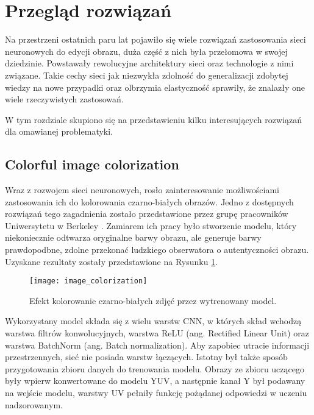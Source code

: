 \section{Przegląd rozwiązań}
  Na przestrzeni ostatnich paru lat pojawiło się wiele rozwiązań zastosowania
  sieci neuronowych do edycji obrazu, duża część z nich była przełomowa w
  swojej dziedzinie. Powstawały rewolucyjne architektury sieci oraz technologie
  z nimi związane. Takie cechy sieci jak niezwykła zdolność do generalizacji zdobytej wiedzy na nowe przypadki oraz olbrzymia elastyczność sprawiły, że
  znalazły one wiele rzeczywistych zastosowań.

  W tym rozdziale skupiono się na przedstawieniu kilku interesujących rozwiązań
  dla omawianej problematyki.

  \subsection{Colorful image colorization}

    Wraz z rozwojem sieci neuronowych, rosło zainteresowanie możliwościami zastosowania
    ich do kolorowania czarno-białych obrazów. Jedno z dostępnych rozwiązań tego
    zagadnienia zostało przedstawione przez grupę pracowników Uniwersytetu w
    Berkeley \cite{colorful_image_colorization}. Zamiarem ich pracy było stworzenie
    modelu, który niekoniecznie odtwarza oryginalne barwy obrazu, ale generuje
    barwy prawdopodbne, zdolne przekonać ludzkiego obserwatora o autentyczności
    obrazu. Uzyskane rezultaty zostały przedstawione na
    Rysunku \ref{fig:colorful_image_colorization}.

    \begin{figure}[ht]
      \centering
      \texttt{[image: image\_colorization]}
      \caption[Efekt kolorowanie czarno-białych zdjęć przez wytrenowany model - źródło:
      \cite{colorful_image_colorization}]{Efekt kolorowanie czarno-białych zdjęć przez wytrenowany model.}
      \label{fig:colorful_image_colorization}
    \end{figure}

    Wykorzystany model składa się z wielu warstw CNN, w których skład wchodzą
    warstwa filtrów konwolucyjnych, warstwa ReLU (ang. Rectified
    Linear Unit) oraz warstwa BatchNorm (ang. Batch normalization).
    Aby zapobiec utracie informacji przestrzennych, sieć nie posiada warstw łączących.
    Istotny był także sposób
    przygotowania zbioru danych do trenowania modelu. Obrazy ze zbioru uczącego
    były wpierw konwertowane do modelu YUV, a następnie kanał Y był podawany na
    wejście modelu, warstwy UV pełniły funkcję pożądanej odpowiedzi w uczeniu
    nadzorowanym.

